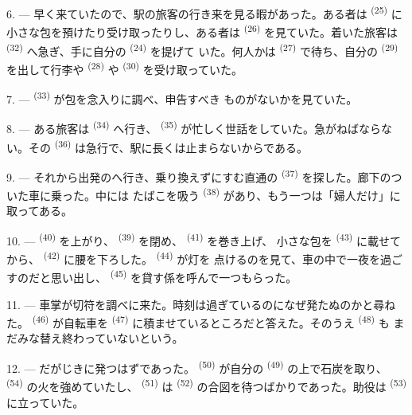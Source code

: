 6. --- 早く来ていたので、駅の旅客の行き来を見る暇があった。ある者は
 \textsuperscript{(25)} に小さな包を預けたり受け取ったりし、ある者は
 \textsuperscript{(26)} を見ていた。着いた旅客は
\textsuperscript{(32)} へ急ぎ、手に自分の \textsuperscript{(24)} を提げて
いた。何人かは \textsuperscript{(27)} で待ち、自分の
 \textsuperscript{(29)} を出して行李や \textsuperscript{(28)}
や \textsuperscript{(30)} を受け取っていた。

7. ---  \textsuperscript{(33)} が包を念入りに調べ、申告すべき
ものがないかを見ていた。

8. --- ある旅客は \textsuperscript{(34)} へ行き、
\textsuperscript{(35)} が忙しく世話をしていた。急がねばならない。その
\textsuperscript{(36)} は急行で、駅に長くは止まらないからである。

9. --- それから出発のへ行き、乗り換えずにすむ直通の
 \textsuperscript{(37)} を探した。廊下のついた車に乗った。中には
たばこを吸う \textsuperscript{(38)} があり、もう一つは「婦人だけ」に
取ってある。

\VUsaut{3.0mm}

10. ---  \textsuperscript{(40)} を上がり、
\textsuperscript{(39)} を閉め、 \textsuperscript{(41)} を巻き上げ、
小さな包を \textsuperscript{(43)} に載せてから、
\textsuperscript{(42)} に腰を下ろした。 \textsuperscript{(44)} が灯を
点けるのを見て、車の中で一夜を過ごすのだと思い出し、
\textsuperscript{(45)} を貸す係を呼んで一つもらった。

11. --- 車掌が切符を調べに来た。時刻は過ぎているのになぜ発たぬのかと尋ねた。
 \textsuperscript{(46)} が自転車を \textsuperscript{(47)}
に積ませているところだと答えた。そのうえ \textsuperscript{(48)} も
まだみな替え終わっていないという。

12. --- だがじきに発つはずであった。 \textsuperscript{(50)} が自分の
 \textsuperscript{(49)} の上で石炭を取り、
\textsuperscript{(54)} の火を強めていたし、 \textsuperscript{(51)} は
 \textsuperscript{(52)} の合図を待つばかりであった。助役は
 \textsuperscript{(53)} に立っていた。


